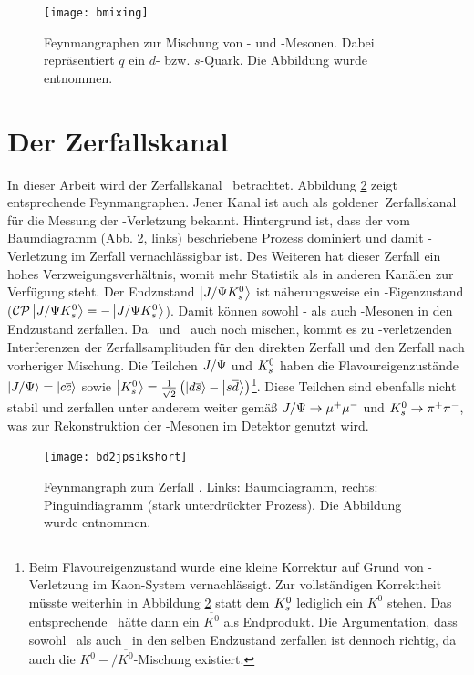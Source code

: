 \begin{figure}[hptb]
\centering
\texttt{[image: bmixing]}
\caption{Feynmangraphen zur Mischung von \Bd- und \Bdbar-Mesonen. Dabei repräsentiert $q$ ein $d$- bzw. $s$-Quark. Die Abbildung wurde \cite{roadmap} entnommen.}
\label{fig:bmixing}
\end{figure}


\section[Der Zerfallskanal \Decaychannel]{Der Zerfallskanal \boldmath\Decaychannel\unboldmath}
In dieser Arbeit wird der Zerfallskanal \Decaychannel\ betrachtet. Abbildung \ref{fig:decay} zeigt entsprechende Feynmangraphen. Jener Kanal ist auch als \glqq goldener\grqq\ Zerfallskanal für die Messung der \CP-Verletzung bekannt. Hintergrund ist, dass der vom Baumdiagramm (Abb. \ref{fig:decay}, links) beschriebene Prozess dominiert und damit \CP-Verletzung im Zerfall vernachlässigbar ist. Des Weiteren hat dieser Zerfall ein hohes Verzweigungsverhältnis, womit mehr Statistik als in anderen Kanälen zur Verfügung steht. Der Endzustand $\Ket{J/\Psi K_s^0}$ ist näherungsweise ein \CP-Eigenzustand ($\text{$\mathcal{CP}$}\Ket{J/\Psi K_s^0} = - \Ket{J/\Psi K_s^0}$). Damit können sowohl \Bd- als auch \Bdbar-Mesonen in den Endzustand zerfallen. Da \Bd\ und \Bdbar\ auch noch mischen, kommt es zu \CP-verletzenden Interferenzen der Zerfallsamplituden für den direkten Zerfall und den Zerfall nach vorheriger Mischung. Die Teilchen $J/\Psi$ und $K_s^0$ haben die Flavoureigenzustände $\Ket{J/\Psi} = \Ket{c\overline{c}}$ sowie $\Ket{K_s^0} = \tfrac{1}{\sqrt{2}}\left(\Ket{d\overline{s}}-\Ket{s\overline{d}}\right)$\footnote{Beim Flavoureigenzustand wurde eine kleine Korrektur auf Grund von \CP-Verletzung im Kaon-System vernachlässigt. Zur vollständigen Korrektheit müsste weiterhin in Abbildung \ref{fig:decay} statt dem $K_s^0$ lediglich ein $K^0$ stehen. Das entsprechende \Bdbar\ hätte dann ein $\overline{K^0}$ als Endprodukt. Die Argumentation, dass sowohl \Bd\ als auch \Bdbar\ in den selben Endzustand zerfallen ist dennoch richtig, da auch die $K^0-/\overline{K^0}$-Mischung existiert.}. Diese Teilchen sind ebenfalls nicht stabil und zerfallen unter anderem weiter gemäß $J/\Psi \rightarrow \mu^+\mu^-$ und $K_s^0 \rightarrow \pi^+\pi^-$, was zur Rekonstruktion der \Bd-Mesonen im Detektor genutzt wird.

\begin{figure}[hptb]
\centering
\texttt{[image: bd2jpsikshort]}
\caption{Feynmangraph zum Zerfall \Decaychannel. Links: Baumdiagramm, rechts: Pinguindiagramm (stark unterdrückter Prozess). Die Abbildung wurde \cite{lhcb-paper} entnommen.}
\label{fig:decay}
\end{figure}

